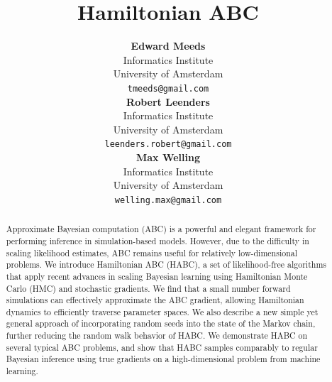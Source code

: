\documentclass[]{article}
\date{}
\title{Hamiltonian ABC}
\author{ {\bf Edward Meeds}  \\
Informatics Institute\\
University of Amsterdam\\
\texttt{tmeeds@gmail.com} \\
\And
{\bf Robert Leenders } \\
Informatics Institute \\
University of Amsterdam \\
\texttt{leenders.robert@gmail.com} \\
\And
{\bf Max Welling }\\
Informatics Institute\\
University of Amsterdam\\
\texttt{welling.max@gmail.com}
}
\begin{document}
 
	\vskip -0.3in
  
\maketitle

% 
% 
% 
\begin{abstract} 
  Approximate Bayesian computation (ABC) is a powerful and elegant framework for performing inference in simulation-based models.  However, due to the difficulty in scaling likelihood estimates, ABC remains useful for relatively low-dimensional problems. We introduce Hamiltonian ABC (HABC), a set of likelihood-free algorithms that apply recent advances in scaling Bayesian learning using Hamiltonian Monte Carlo (HMC) and stochastic gradients.     We find that a small number forward simulations can effectively approximate the ABC gradient, allowing Hamiltonian dynamics to efficiently traverse parameter spaces.  We also describe a new simple yet general approach of incorporating random seeds into the state of the Markov chain, further reducing the random walk behavior of HABC.  We demonstrate HABC on several typical ABC problems, and show that HABC samples comparably to regular Bayesian inference using true gradients on a high-dimensional problem from machine learning.

\end{abstract}
\end{document}
